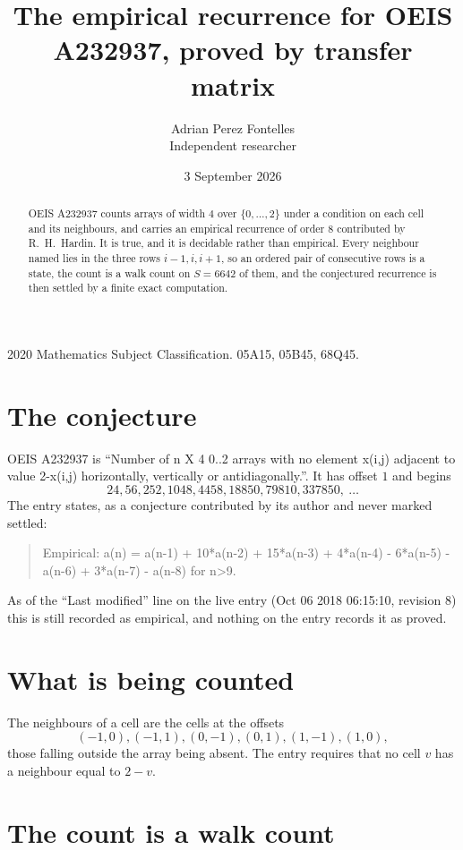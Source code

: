 \documentclass[11pt,a4paper]{article}
\title{The empirical recurrence for OEIS A232937, proved by transfer matrix}
\author{Adrian Perez Fontelles\\ \small Independent researcher}
\date{3 September 2026}
\theoremstyle{plain}
\theoremstyle{definition}
\begin{document}
\maketitle

\begin{abstract}
OEIS A232937 counts arrays of width $4$ over $\{0,\dots,2\}$ under a condition on each cell
and its neighbours, and carries an empirical recurrence of order $8$ contributed by
R.~H.~Hardin. It is true, and it is decidable rather than empirical. Every neighbour named lies
in the three rows $i-1,i,i+1$, so an ordered pair of consecutive rows is a state, the count is
a walk count on $S=6642$ of them, and the conjectured recurrence is then settled by a finite
exact computation.
\end{abstract}

\noindent\small 2020 Mathematics Subject Classification. 05A15, 05B45, 68Q45.\normalsize

\section{The conjecture}

OEIS A232937 is ``Number of n X 4 0..2 arrays with no element x(i,j) adjacent to value 2-x(i,j) horizontally, vertically or antidiagonally.''. It has offset $1$ and begins
\[
24, 56, 252, 1048, 4458, 18850, 79810, 337850,\ \dots
\]
The entry states, as a conjecture contributed by its author and never marked settled:
\begin{quote}
Empirical: a(n) = a(n-1) + 10*a(n-2) + 15*a(n-3) + 4*a(n-4) - 6*a(n-5) - a(n-6) + 3*a(n-7) - a(n-8) for n>9.
\end{quote}
As of the ``Last modified'' line on the live entry (Oct 06 2018 06:15:10, revision 8) this is still
recorded as empirical, and nothing on the entry records it as proved.

\section{What is being counted}

The neighbours of a cell are the cells at the offsets
\[
(-1,0), (-1,1), (0,-1), (0,1), (1,-1), (1,0),
\]
those falling outside the array being absent. The entry requires that no cell $v$ has a neighbour equal to $2-v$.

\section{The count is a walk count}
\end{document}
